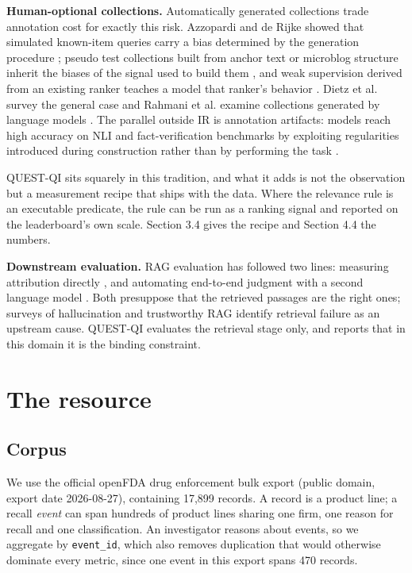 \documentclass[runningheads]{llncs}
\begin{document}
\textbf{Human-optional collections.} Automatically generated collections trade annotation cost for exactly this risk. Azzopardi and de Rijke showed that simulated known-item queries carry a bias determined by the generation procedure \cite{azzopardi2007simulated}; pseudo test collections built from anchor text or microblog structure inherit the biases of the signal used to build them \cite{asadi2011pseudo,berendsen2013pseudo}, and weak supervision derived from an existing ranker teaches a model that ranker's behavior \cite{dehghani2017weak}. Dietz et al. survey the general case \cite{dietz2020humansoptional} and Rahmani et al. examine collections generated by language models \cite{rahmani2024synthetic}. The parallel outside IR is annotation artifacts: models reach high accuracy on NLI and fact-verification benchmarks by exploiting regularities introduced during construction rather than by performing the task \cite{gururangan2018artifacts,schuster2019fever}.

QUEST-QI sits squarely in this tradition, and what it adds is not the observation but a measurement recipe that ships with the data. Where the relevance rule is an executable predicate, the rule can be run as a ranking signal and reported on the leaderboard's own scale. Section 3.4 gives the recipe and Section 4.4 the numbers.

\textbf{Downstream evaluation.} RAG evaluation has followed two lines: measuring attribution directly \cite{rashkin2021attribution,bohnet2022aqa,gao2023alce,min2023factscore}, and automating end-to-end judgment with a second language model \cite{es2023ragas,saadfalcon2023ares,zheng2023llmjudge}. Both presuppose that the retrieved passages are the right ones; surveys of hallucination \cite{ji2022hallucination} and trustworthy RAG \cite{ni2025trustworthyrag} identify retrieval failure as an upstream cause. QUEST-QI evaluates the retrieval stage only, and reports that in this domain it is the binding constraint.


\section{The resource}

\subsection{Corpus}
We use the official openFDA drug enforcement bulk export (public domain, export date 2026-08-27), containing 17,899 records. A record is a product line; a recall \textit{event} can span hundreds of product lines sharing one firm, one reason for recall and one classification. An investigator reasons about events, so we aggregate by \texttt{event\_id}, which also removes duplication that would otherwise dominate every metric, since one event in this export spans 470 records.
\end{document}
